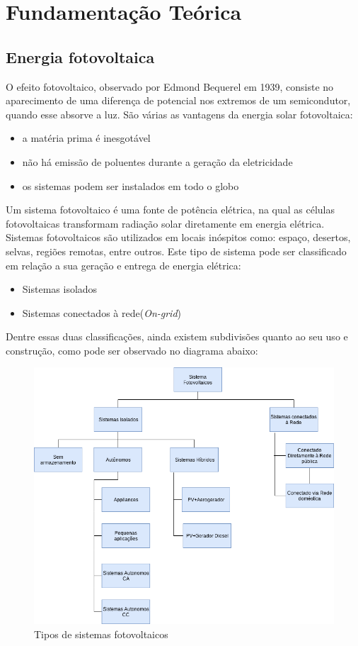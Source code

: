 \chapter{Fundamentação Teórica}
\label{cap:funcamentacao:teorica}
\section{Energia fotovoltaica}
O efeito fotovoltaico, observado por Edmond Bequerel em 1939, consiste no aparecimento de uma diferença de potencial nos extremos de um semicondutor, quando esse absorve  a luz.\cite{} São várias as vantagens da energia solar fotovoltaica:
\begin{itemize}
\item a matéria prima é inesgotável
\item não há emissão de poluentes durante a geração da eletricidade
\item os sistemas podem ser instalados em todo o globo
\end{itemize}


Um sistema fotovoltaico é uma fonte de potência elétrica, na qual as células fotovoltaicas transformam radiação solar diretamente em energia elétrica. Sistemas fotovoltaicos são utilizados em locais inóspitos como: espaço, desertos, selvas, regiões remotas, entre outros. Este tipo de sistema pode ser classificado em relação a sua geração e entrega de energia elétrica:
\begin{itemize}
\item Sistemas isolados
\item Sistemas conectados à rede(\textit{On-grid})
\end{itemize}

Dentre essas duas classificações, ainda existem subdivisões quanto ao seu uso e construção, como pode ser observado no diagrama abaixo: 
\begin{figure}[H]
    \centering
    \includegraphics[width=1.0\textwidth]{figuras/sistemasFoto.png}
    \caption{Tipos de sistemas fotovoltaicos}
    \label{fig:caminho-objetos-scheduling}
\end{figure}

